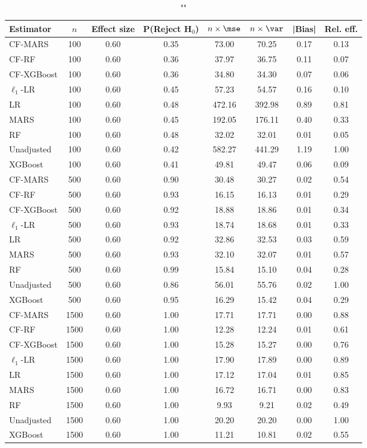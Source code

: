 \begin{table}
\centering
\caption{""}
\begin{tabular}{lccccccc}
\toprule
Estimator & $n$ & Effect size & P(Reject H$_0$) & $n\times\mse$ & $n\times \var$ & |Bias| & Rel. eff.\\ \midrule
CF-MARS & 100 & 0.60 & 0.35 &  73.00 &  70.25 & 0.17 & 0.13 \\ 
CF-RF & 100 & 0.60 & 0.36 &  37.97 &  36.75 & 0.11 & 0.07 \\ 
CF-XGBoost & 100 & 0.60 & 0.36 &  34.80 &  34.30 & 0.07 & 0.06 \\ 
$\ell_1$-LR & 100 & 0.60 & 0.45 &  57.23 &  54.57 & 0.16 & 0.10 \\ 
LR & 100 & 0.60 & 0.48 & 472.16 & 392.98 & 0.89 & 0.81 \\ 
MARS & 100 & 0.60 & 0.45 & 192.05 & 176.11 & 0.40 & 0.33 \\ 
RF & 100 & 0.60 & 0.48 &  32.02 &  32.01 & 0.01 & 0.05 \\ 
Unadjusted & 100 & 0.60 & 0.42 & 582.27 & 441.29 & 1.19 & 1.00 \\ 
XGBoost & 100 & 0.60 & 0.41 &  49.81 &  49.47 & 0.06 & 0.09 \\ \addlinespace 
CF-MARS & 500 & 0.60 & 0.90 &  30.48 &  30.27 & 0.02 & 0.54 \\ 
CF-RF & 500 & 0.60 & 0.93 &  16.15 &  16.13 & 0.01 & 0.29 \\ 
CF-XGBoost & 500 & 0.60 & 0.92 &  18.88 &  18.86 & 0.01 & 0.34 \\ 
$\ell_1$-LR & 500 & 0.60 & 0.93 &  18.74 &  18.68 & 0.01 & 0.33 \\ 
LR & 500 & 0.60 & 0.92 &  32.86 &  32.53 & 0.03 & 0.59 \\ 
MARS & 500 & 0.60 & 0.93 &  32.10 &  32.07 & 0.01 & 0.57 \\ 
RF & 500 & 0.60 & 0.99 &  15.84 &  15.10 & 0.04 & 0.28 \\ 
Unadjusted & 500 & 0.60 & 0.86 &  56.01 &  55.76 & 0.02 & 1.00 \\ 
XGBoost & 500 & 0.60 & 0.95 &  16.29 &  15.42 & 0.04 & 0.29 \\ \addlinespace 
CF-MARS & 1500 & 0.60 & 1.00 &  17.71 &  17.71 & 0.00 & 0.88 \\ 
CF-RF & 1500 & 0.60 & 1.00 &  12.28 &  12.24 & 0.01 & 0.61 \\ 
CF-XGBoost & 1500 & 0.60 & 1.00 &  15.28 &  15.27 & 0.00 & 0.76 \\ 
$\ell_1$-LR & 1500 & 0.60 & 1.00 &  17.90 &  17.89 & 0.00 & 0.89 \\ 
LR & 1500 & 0.60 & 1.00 &  17.12 &  17.04 & 0.01 & 0.85 \\ 
MARS & 1500 & 0.60 & 1.00 &  16.72 &  16.71 & 0.00 & 0.83 \\ 
RF & 1500 & 0.60 & 1.00 &   9.93 &   9.21 & 0.02 & 0.49 \\ 
Unadjusted & 1500 & 0.60 & 1.00 &  20.20 &  20.20 & 0.00 & 1.00 \\ 
XGBoost & 1500 & 0.60 & 1.00 &  11.21 &  10.81 & 0.02 & 0.55 \\
\bottomrule
\end{tabular}
\end{table}

